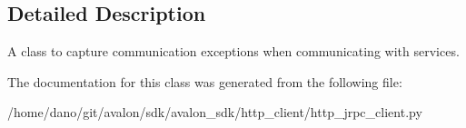 \subsection{Detailed Description}
\begin{DoxyVerb}A class to capture communication exceptions when communicating with
services.
\end{DoxyVerb}
 

The documentation for this class was generated from the following file\+:\begin{DoxyCompactItemize}
\item 
/home/dano/git/avalon/sdk/avalon\+\_\+sdk/http\+\_\+client/http\+\_\+jrpc\+\_\+client.\+py\end{DoxyCompactItemize}
